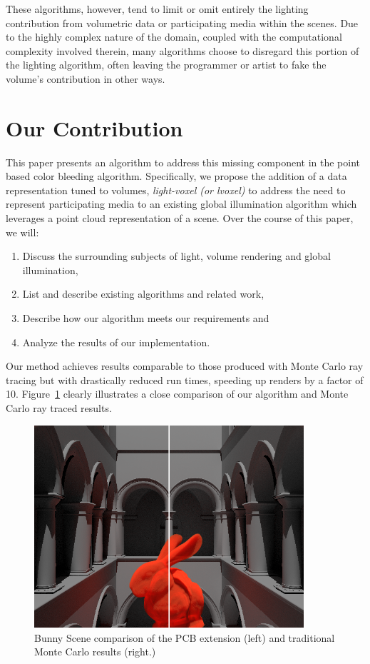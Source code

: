 These algorithms, however, tend to limit or omit entirely the lighting contribution from volumetric data or participating media within the scenes.  Due to the highly complex nature of the domain, coupled with the computational complexity involved therein, many algorithms choose to disregard this portion of the lighting algorithm, often leaving the programmer or artist to fake the volume's contribution in other ways.


\section{Our Contribution}

This paper presents an algorithm to address this missing component in the point based color bleeding algorithm.  Specifically, we propose the addition of a data representation tuned to volumes,  \emph{light-voxel (or lvoxel)} to address the need to represent participating media to an existing global illumination algorithm which leverages a point cloud representation of a scene.  Over the course of this paper, we will:

\begin{enumerate}
\item Discuss the surrounding subjects of light, volume rendering and global illumination,
\item List and describe existing algorithms and related work,
\item Describe how our algorithm meets our requirements and
\item Analyze the results of our implementation.
\end{enumerate}

Our method achieves results comparable to those produced with Monte Carlo ray tracing but with drastically reduced run times, speeding up renders by a factor of 10.  Figure~\ref{fig:compare} clearly illustrates a close comparison of our algorithm and Monte Carlo ray traced results.

\begin{figure}[h!]
    \centering
    \includegraphics[width=100mm]{../img/compare.png}
    \caption{Bunny Scene comparison of the PCB extension (left) and traditional Monte Carlo results (right.)}
    \label{fig:compare}
\end{figure}
